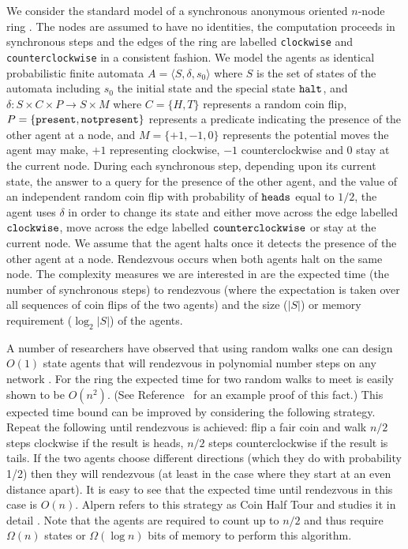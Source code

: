 \documentclass[lotsofwhite]{patmorin}
\begin{document}
We consider the standard model of a synchronous anonymous oriented
$n$-node ring \cite{santoro}. The nodes are assumed to have no
identities, the computation proceeds in synchronous steps and the
edges of the ring are labelled {\tt clockwise} and {\tt
counterclockwise} in a consistent fashion.  We model the agents as
identical probabilistic finite automata $A = \langle S, \delta, s_0
\rangle$ where
$S$ is the set of states of the automata including $s_0$ the initial
state and the special state ${\tt halt}$, and $\delta:S \times C
\times P \to S \times M$ where $C = \{ H, T \}$ represents a random
coin flip, $P = \{ \tt present, notpresent \}$ represents a predicate
indicating the presence of the other agent at a node, and $M = \{ +1,
-1, 0 \}$ represents the potential moves the agent may make, $+1$
representing clockwise, $-1$ counterclockwise and $0$ stay at the
current node.  During each synchronous step, depending upon its
current state, the answer to a query for the presence of the other
agent, and the value of an independent random coin flip with
probability of $\tt heads$ equal to $1/2$, the agent uses $\delta$ in
order to change its state and either move across the edge labelled $\tt
clockwise$, move across the edge labelled $\tt counterclockwise$ or
stay at the current node. We assume that the
agent halts once it detects the presence of the other agent at a node.
Rendezvous occurs when both agents halt on the same node.  The
complexity measures  we are interested in are the expected time (the
number of synchronous steps) to rendezvous (where the expectation is
taken over all sequences of coin flips of the two agents) and the size
($|S|$) or memory requirement ($\log_2 |S|$) of the agents.  

A number of researchers have observed that using random walks one can
design $O(1)$ state agents that will rendezvous in polynomial number
steps on any network \cite{coppersmith}. For the ring the expected
time for two random walks to meet is easily shown to be $O(n^2)$. (See
Reference~\cite{kk} for an example proof of this fact.) This expected time bound
can be improved by considering the following strategy.  Repeat the
following until rendezvous is achieved: flip a fair coin and walk
$n/2$ steps clockwise if the result is heads, $n/2$ steps
counterclockwise if the result is tails.  If the two agents choose
different directions (which they do with probability 1/2) then they
will rendezvous (at least in the case where they start at an even
distance apart).  It is easy to see that the expected time until
rendezvous in this case is $O(n)$. Alpern refers to this strategy as
Coin Half Tour and studies it in detail \cite{alpern95}.  Note that
the agents are required to count up to $n/2$ and thus require $\Omega(n)$
states or $\Omega(\log n)$ bits of memory to perform this algorithm. 
\end{document}
